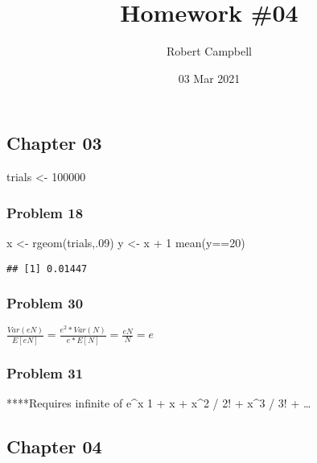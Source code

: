 \documentclass[
]{article}
\title{Homework \#04}
\author{Robert Campbell}
\date{03 Mar 2021}
\newenvironment{Shaded}{\begin{snugshade}}{\end{snugshade}}
\newcommand{\DecValTok}[1]{\textcolor[rgb]{0.00,0.00,0.81}{#1}}
\newcommand{\FunctionTok}[1]{\textcolor[rgb]{0.00,0.00,0.00}{#1}}
\newcommand{\NormalTok}[1]{#1}
\newcommand{\OtherTok}[1]{\textcolor[rgb]{0.56,0.35,0.01}{#1}}
\newcommand{\SpecialCharTok}[1]{\textcolor[rgb]{0.00,0.00,0.00}{#1}}
\begin{document}
\maketitle

\hypertarget{chapter-03}{%
\subsection{Chapter 03}\label{chapter-03}}

\begin{Shaded}
\begin{Highlighting}[]
\NormalTok{trials }\OtherTok{\textless{}{-}} \DecValTok{100000}
\end{Highlighting}
\end{Shaded}

\hypertarget{problem-18}{%
\subsubsection{Problem 18}\label{problem-18}}

\begin{Shaded}
\begin{Highlighting}[]
\NormalTok{x }\OtherTok{\textless{}{-}} \FunctionTok{rgeom}\NormalTok{(trials,.}\DecValTok{09}\NormalTok{)}
\NormalTok{y }\OtherTok{\textless{}{-}}\NormalTok{ x }\SpecialCharTok{+} \DecValTok{1}
\FunctionTok{mean}\NormalTok{(y}\SpecialCharTok{==}\DecValTok{20}\NormalTok{)}
\end{Highlighting}
\end{Shaded}

\begin{verbatim}
## [1] 0.01447
\end{verbatim}

\hypertarget{problem-30}{%
\subsubsection{Problem 30}\label{problem-30}}

\(\frac{Var(eN)}{E[eN]} = \frac{e^2*Var(N)}{e*E[N]} = \frac{eN}{N} = e\)

\hypertarget{problem-31}{%
\subsubsection{Problem 31}\label{problem-31}}

****Requires infinite of e\^{}x 1 + x + x\^{}2 / 2! + x\^{}3 / 3! +
\ldots{}

\hypertarget{chapter-04}{%
\subsection{Chapter 04}\label{chapter-04}}
\end{document}
